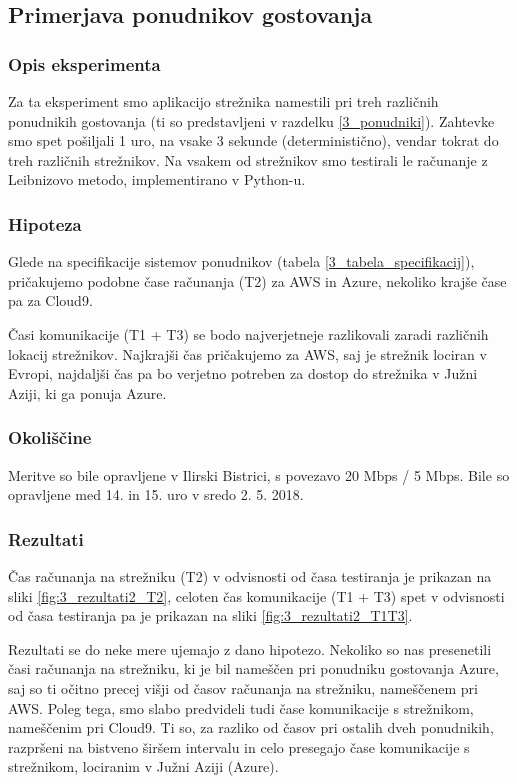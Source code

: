 \subsection{Primerjava ponudnikov gostovanja}

\subsubsection{Opis eksperimenta}

Za ta eksperiment smo aplikacijo strežnika namestili pri treh različnih ponudnikih gostovanja (ti so predstavljeni v razdelku \ref{3_ponudniki}).
Zahtevke smo spet pošiljali 1 uro, na vsake 3 sekunde (deterministično), vendar tokrat do treh različnih strežnikov.
Na vsakem od strežnikov smo testirali le računanje z Leibnizovo metodo, implementirano v Python-u.

\subsubsection{Hipoteza}

Glede na specifikacije sistemov ponudnikov (tabela \ref{3_tabela_specifikacij}), pričakujemo podobne čase računanja (T2) za AWS in Azure, nekoliko krajše čase pa za Cloud9.

Časi komunikacije (T1 + T3) se bodo najverjetneje razlikovali zaradi različnih lokacij strežnikov.
Najkrajši čas pričakujemo za AWS, saj je strežnik lociran v Evropi, najdaljši čas pa bo verjetno potreben za dostop do strežnika v Južni Aziji, ki ga ponuja Azure.

\subsubsection{Okoliščine}

Meritve so bile opravljene v Ilirski Bistrici, s povezavo 20 Mbps / 5 Mbps.
Bile so opravljene med 14. in 15. uro v sredo 2. 5. 2018.

\subsubsection{Rezultati}

Čas računanja na strežniku (T2) v odvisnosti od časa testiranja je prikazan na sliki \ref{fig:3_rezultati2_T2}, celoten čas komunikacije (T1 + T3) spet v odvisnosti od časa testiranja pa je prikazan na sliki \ref{fig:3_rezultati2_T1T3}.

Rezultati se do neke mere ujemajo z dano hipotezo.
Nekoliko so nas presenetili časi računanja na strežniku, ki je bil nameščen pri ponudniku gostovanja Azure, saj so ti očitno precej višji od časov računanja na strežniku, nameščenem pri AWS.
Poleg tega, smo slabo predvideli tudi čase komunikacije s strežnikom, nameščenim pri Cloud9.
Ti so, za razliko od časov pri ostalih dveh ponudnikih, razpršeni na bistveno širšem intervalu in celo presegajo čase komunikacije s strežnikom, lociranim v Južni Aziji (Azure).

